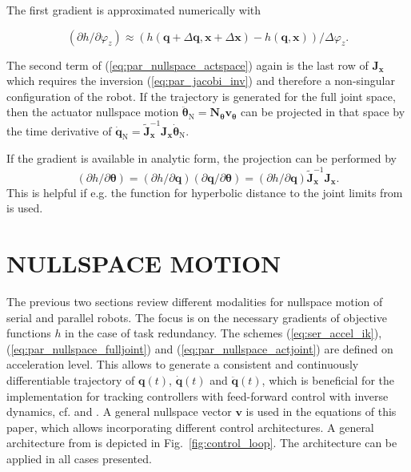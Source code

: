 \documentclass[a4paper,twoside]{article}
\begin{document}
The first gradient is approximated numerically with %



\begin{equation}
(\partial h / \partial \varphi_z) \approx (h(\bm{q}+ \Delta \bm{q}, \bm{x} + \Delta \bm{x}) - h(\bm{q},\bm{x}))/\Delta \varphi_z.
\end{equation}

The second term of (\ref{eq:par_nullspace_actspace}) again is the last row of $\bm{J}_{\bm{x}}$ which requires the inversion (\ref{eq:par_jacobi_inv}) and therefore a non-singular configuration of the robot.
If the trajectory is generated for the full joint space, then the actuator nullspace motion $\ddot{\bm{\theta}}_\mathrm{N}=\bm{N}_{\bm{\theta}}\bm{v}_{\bm{\theta}}$ can be projected in that space by the time derivative of $\dot{\bm{q}}_\mathrm{N}=\tilde{\bm{J}}^{-1}_{\bm{x}}\bm{J}_{\bm{x}} \dot{\bm{\theta}}_\mathrm{N}$.

If the gradient is available in analytic form, the projection can be performed by
\begin{equation}
(\partial h / \partial \bm{\theta}) = (\partial h / \partial \bm{q}) (\partial \bm{q} / \partial \bm{\theta}) = (\partial h / \partial \bm{q}) \tilde{\bm{J}}_{\bm{x}}^{-1}\bm{J}_{\bm{x}}.
\end{equation}
This is helpful if e.g. the function for hyperbolic distance to the joint limits from \cite{ZhuQuCaoYan2013} is used.

\section{\uppercase{Nullspace Motion}}
\label{sec:control_loop}



The previous two sections review different modalities for nullspace motion of serial and parallel robots.
The focus is on the necessary gradients of objective functions $h$ in the case of task redundancy.
The schemes (\ref{eq:ser_accel_ik}), (\ref{eq:par_nullspace_fulljoint}) and (\ref{eq:par_nullspace_actjoint}) are defined on acceleration level.
This allows to generate a consistent and continuously differentiable trajectory of $\bm{q}(t)$, $\dot{\bm{q}}(t)$ and $\ddot{\bm{q}}(t)$, which is beneficial for the implementation for tracking controllers with feed-forward control with inverse dynamics, cf. \cite{DeLucaOriSic1992} and \cite{ReiterMueGat2018}.
A general nullspace vector $\bm{v}$ is used in the equations of this paper, which allows incorporating different control architectures.
A general architecture from \cite{DeLucaOriSic1992} is depicted in Fig.~\ref{fig:control_loop}.
The architecture can be applied in all cases presented.
\end{document}
